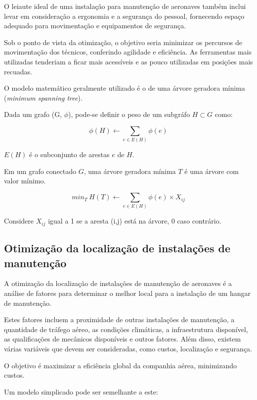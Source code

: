 \documentclass{article}
\begin{document}
O leiaute ideal de uma instalação para manutenção de aeronaves também inclui levar em consideração a ergonomia e a segurança do pessoal, fornecendo espaço adequado para movimentação e equipamentos de segurança.

Sob o ponto de vista da otimização, o objetivo seria minimizar os percursos de movimentação dos técnicos, conferindo agilidade e eficiência. As ferramentas mais utilizadas tenderiam a ficar mais acessíveis e as pouco utilizadas em posições mais recuadas.

O modelo matemático geralmente utilizado é o de uma árvore geradora mínima ({\it minimum spanning tree}).

Dada um grafo (G, $\phi$), pode-se definir o peso de um subgráfo $H \subset G$ como:

\begin{equation} \label{eq:fo1}
\phi(H) \gets \sum_{e \in E(H)} \phi (e)
\end{equation}

$E(H)$ é o subconjunto de arestas $e$ de $H$.

Em um grafo conectado $G$, uma árvore geradora mínima $T$ é uma árvore com valor mínimo.

\begin{equation} \label{eq:fo2}
min_T\ H(T) \gets \sum_{e \in E(H)} \phi (e) \times X_{ij}
\end{equation}


Considere $X_{ij}$ igual a 1 se a aresta (i,j) está na árvore, 0 caso contrário.


\subsection{Otimização da localização de instalações de manutenção}

A otimização da localização de instalações de manutenção de aeronaves é a análise de fatores para determinar o melhor local para a instalação de um hangar de manutenção.

Estes fatores incluem a proximidade de outras instalações de manutenção, a quantidade de tráfego aéreo, as condições climáticas, a infraestrutura disponível, as qualificações de mecânicos disponíveis e outros fatores. Além disso, existem várias variáveis que devem ser consideradas, como custos, localização e segurança.

O objetivo é maximizar a eficiência global da companhia aérea, minimizando custos.

Um modelo simplicado pode ser semelhante a este:
\end{document}
